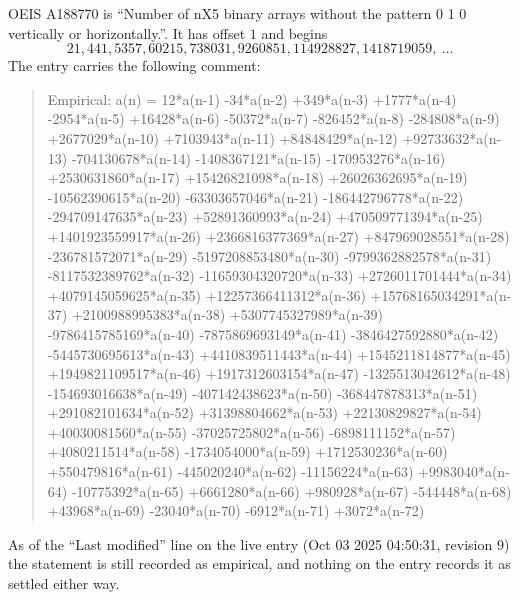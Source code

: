 \documentclass[11pt,a4paper]{article}
\theoremstyle{plain}
\theoremstyle{definition}
\begin{document}
OEIS A188770 is ``Number of nX5 binary arrays without the pattern 0 1 0 vertically or horizontally.''. It has offset $1$ and begins
\[
21, 441, 5357, 60215, 738031, 9260851, 114928827, 1418719059,\ \dots
\]
The entry carries the following comment:
\begin{quote}\small
Empirical: a(n) = 12*a(n-1) -34*a(n-2) +349*a(n-3) +1777*a(n-4) -2954*a(n-5) +16428*a(n-6) -50372*a(n-7) -826452*a(n-8) -284808*a(n-9) +2677029*a(n-10) +7103943*a(n-11) +84848429*a(n-12) +92733632*a(n-13) -704130678*a(n-14) -1408367121*a(n-15) -170953276*a(n-16) +2530631860*a(n-17) +15426821098*a(n-18) +26026362695*a(n-19) -10562390615*a(n-20) -63303657046*a(n-21) -186442796778*a(n-22) -294709147635*a(n-23) +52891360993*a(n-24) +470509771394*a(n-25) +1401923559917*a(n-26) +2366816377369*a(n-27) +847969028551*a(n-28) -236781572071*a(n-29) -5197208853480*a(n-30) -9799362882578*a(n-31) -8117532389762*a(n-32) -11659304320720*a(n-33) +2726011701444*a(n-34) +4079145059625*a(n-35) +12257366411312*a(n-36) +15768165034291*a(n-37) +2100988995383*a(n-38) +5307745327989*a(n-39) -9786415785169*a(n-40) -7875869693149*a(n-41) -3846427592880*a(n-42) -5445730695613*a(n-43) +4410839511443*a(n-44) +1545211814877*a(n-45) +1949821109517*a(n-46) +1917312603154*a(n-47) -1325513042612*a(n-48) -154693016638*a(n-49) -407142438623*a(n-50) -368447878313*a(n-51) +291082101634*a(n-52) +31398804662*a(n-53) +22130829827*a(n-54) +40030081560*a(n-55) -37025725802*a(n-56) -6898111152*a(n-57) +4080211514*a(n-58) -1734054000*a(n-59) +1712530236*a(n-60) +550479816*a(n-61) -445020240*a(n-62) -11156224*a(n-63) +9983040*a(n-64) -10775392*a(n-65) +6661280*a(n-66) +980928*a(n-67) -544448*a(n-68) +43968*a(n-69) -23040*a(n-70) -6912*a(n-71) +3072*a(n-72)
\end{quote}
As of the ``Last modified'' line on the live entry (Oct 03 2025 04:50:31, revision 9) the statement is
still recorded as empirical, and nothing on the entry records it as settled either way.
\end{document}
